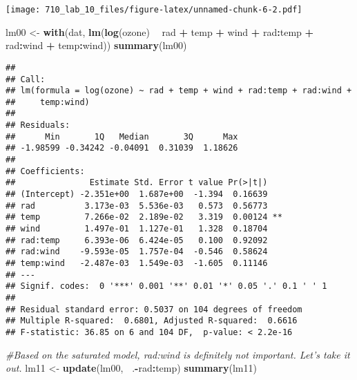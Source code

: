 \documentclass[]{article}
\newenvironment{Shaded}{\begin{snugshade}}{\end{snugshade}}
\newcommand{\KeywordTok}[1]{\textcolor[rgb]{0.13,0.29,0.53}{\textbf{#1}}}
\newcommand{\StringTok}[1]{\textcolor[rgb]{0.31,0.60,0.02}{#1}}
\newcommand{\CommentTok}[1]{\textcolor[rgb]{0.56,0.35,0.01}{\textit{#1}}}
\newcommand{\OperatorTok}[1]{\textcolor[rgb]{0.81,0.36,0.00}{\textbf{#1}}}
\newcommand{\NormalTok}[1]{#1}
\begin{document}
\texttt{[image: 710\_lab\_10\_files/figure-latex/unnamed-chunk-6-2.pdf]}

\begin{Shaded}
\begin{Highlighting}[]
\NormalTok{lm00 <-}\StringTok{ }\KeywordTok{with}\NormalTok{(dat, }\KeywordTok{lm}\NormalTok{(}\KeywordTok{log}\NormalTok{(ozone) }\OperatorTok{~}\StringTok{ }\NormalTok{rad }\OperatorTok{+}\StringTok{ }\NormalTok{temp }\OperatorTok{+}\StringTok{ }\NormalTok{wind }\OperatorTok{+}\StringTok{ }\NormalTok{rad}\OperatorTok{:}\NormalTok{temp }\OperatorTok{+}\StringTok{ }\NormalTok{rad}\OperatorTok{:}\NormalTok{wind }\OperatorTok{+}\StringTok{ }\NormalTok{temp}\OperatorTok{:}\NormalTok{wind))}
\KeywordTok{summary}\NormalTok{(lm00)}
\end{Highlighting}
\end{Shaded}

\begin{verbatim}
## 
## Call:
## lm(formula = log(ozone) ~ rad + temp + wind + rad:temp + rad:wind + 
##     temp:wind)
## 
## Residuals:
##      Min       1Q   Median       3Q      Max 
## -1.98599 -0.34242 -0.04091  0.31039  1.18626 
## 
## Coefficients:
##               Estimate Std. Error t value Pr(>|t|)   
## (Intercept) -2.351e+00  1.687e+00  -1.394  0.16639   
## rad          3.173e-03  5.536e-03   0.573  0.56773   
## temp         7.266e-02  2.189e-02   3.319  0.00124 **
## wind         1.497e-01  1.127e-01   1.328  0.18704   
## rad:temp     6.393e-06  6.424e-05   0.100  0.92092   
## rad:wind    -9.593e-05  1.757e-04  -0.546  0.58624   
## temp:wind   -2.487e-03  1.549e-03  -1.605  0.11146   
## ---
## Signif. codes:  0 '***' 0.001 '**' 0.01 '*' 0.05 '.' 0.1 ' ' 1
## 
## Residual standard error: 0.5037 on 104 degrees of freedom
## Multiple R-squared:  0.6801, Adjusted R-squared:  0.6616 
## F-statistic: 36.85 on 6 and 104 DF,  p-value: < 2.2e-16
\end{verbatim}

\begin{Shaded}
\begin{Highlighting}[]
\CommentTok{#Based on the saturated model, rad:wind is definitely not important. Let's take it out. }
\NormalTok{lm11 <-}\StringTok{ }\KeywordTok{update}\NormalTok{(lm00, }\OperatorTok{~}\NormalTok{.}\OperatorTok{-}\NormalTok{rad}\OperatorTok{:}\NormalTok{temp)}
\KeywordTok{summary}\NormalTok{(lm11)}
\end{Highlighting}
\end{Shaded}
\end{document}
